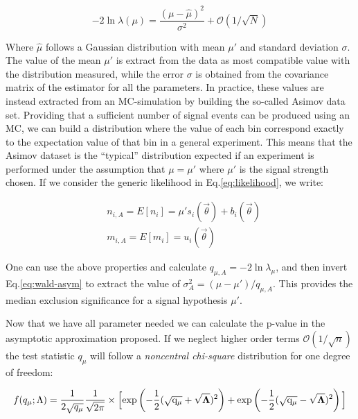 \begin{equation}
  \label{eq:wald-asym}
  - 2 \ln{\lambda(\mu)} = \frac{(\mu - \hat{\mu})^2}{\sigma^2} + \mathcal{O}(1/\sqrt{N})
\end{equation}

Where $\hat{\mu}$ follows a Gaussian distribution with mean $\mu'$ and standard deviation $\sigma$. The value of the mean $\mu'$ is extract from the data as most compatible value with the distribution measured, while the error $\sigma$ is obtained from the covariance matrix of the estimator for all the parameters. In practice, these values are instead extracted from an MC-simulation by building the so-called Asimov data set. Providing that a sufficient number of signal events can be produced using an MC, we can build a distribution where the value of each bin correspond exactly to the expectation value of that bin in a general experiment. This means that the Asimov dataset is the ``typical'' distribution expected if an experiment is performed under the assumption that $\mu = \mu'$ where $\mu'$ is the signal strength chosen. If we consider the generic likelihood in Eq.\ref{eq:likelihood}, we write:

\begin{equation}
  \label{eq:asimov-dataset-prop}
  \begin{aligned}
    &n_{i, A} = E[n_i] = \mu' s_i (\vec{\theta}) + b_i(\vec{\theta}) \\
    &m_{i, A} = E[m_i] = u_i(\vec{\theta})
  \end{aligned}    
\end{equation}

One can use the above properties and calculate $q_{\mu, A} = - 2 \ln{\lambda_{\mu}}$, and then invert Eq.\ref{eq:wald-asym} to extract the value of $\sigma^2_{A} = (\mu - \mu')/q_{\mu,A}$. This provides the median exclusion significance for a signal hypothesis $\mu'$.

Now that we have all parameter needed  we can calculate the p-value in the asymptotic approximation proposed. If we neglect higher order terms $\mathcal{O}(1/\sqrt{n})$ the test statistic $q_{\mu}$ will follow a \textit{noncentral chi-square} distribution for one degree of freedom:

\begin{equation}
  \label{eq:p-value-asym}
  f(q_{\mu}; \Lambda) = \frac{1}{2\sqrt{q_{\mu}}} \frac{1}{\sqrt{2\pi}} \times \Big[ \rm{exp}\left(-\frac{1}{2} (\sqrt{q_{\mu}} + \sqrt{\boldsymbol{\Lambda}})^2 \right) + \rm{exp}\left(-\frac{1}{2} (\sqrt{q_{\mu}} - \sqrt{\boldsymbol{\Lambda}})^2 \right) \Big]
\end{equation}

